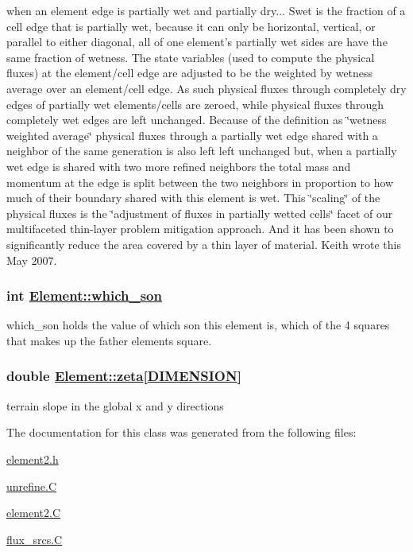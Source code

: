 when an element edge is partially wet and partially dry... Swet is the fraction of a cell edge that is partially wet, because it can only be horizontal, vertical, or parallel to either diagonal, all of one element's partially wet sides are have the same fraction of wetness. The state variables (used to compute the physical fluxes) at the element/cell edge are adjusted to be the weighted by wetness average over an element/cell edge. As such physical fluxes through completely dry edges of partially wet elements/cells are zeroed, while physical fluxes through completely wet edges are left unchanged. Because of the definition as \char`\"{}wetness weighted average\char`\"{} physical fluxes through a partially wet edge shared with a neighbor of the same generation is also left left unchanged but, when a partially wet edge is shared with two more refined neighbors the total mass and momentum at the edge is split between the two neighbors in proportion to how much of their boundary shared with this element is wet. This \char`\"{}scaling\char`\"{} of the physical fluxes is the \char`\"{}adjustment of fluxes in partially wetted cells\char`\"{} facet of our multifaceted thin-layer problem mitigation approach. And it has been shown to significantly reduce the area covered by a thin layer of material. Keith wrote this May 2007. 

\hypertarget{classElement_r21}{
\subsubsection[which\_\-son]{\setlength{\rightskip}{0pt plus 5cm}int \hyperlink{classElement_r21}{Element::which\_\-son}}}
\label{classElement_r21}


which\_\-son holds the value of which son this element is, which of the 4 squares that makes up the father elements square. 

\hypertarget{classElement_r38}{
\subsubsection[zeta]{\setlength{\rightskip}{0pt plus 5cm}double \hyperlink{classElement_r38}{Element::zeta}\mbox{[}\hyperlink{constant_8h_a15}{DIMENSION}\mbox{]}}}
\label{classElement_r38}


terrain slope in the global x and y directions 



The documentation for this class was generated from the following files:\begin{CompactItemize}
\item 
\hyperlink{element2_8h}{element2.h}\item 
\hyperlink{unrefine_8C}{unrefine.C}\item 
\hyperlink{element2_8C}{element2.C}\item 
\hyperlink{flux__srcs_8C}{flux\_\-srcs.C}\end{CompactItemize}
